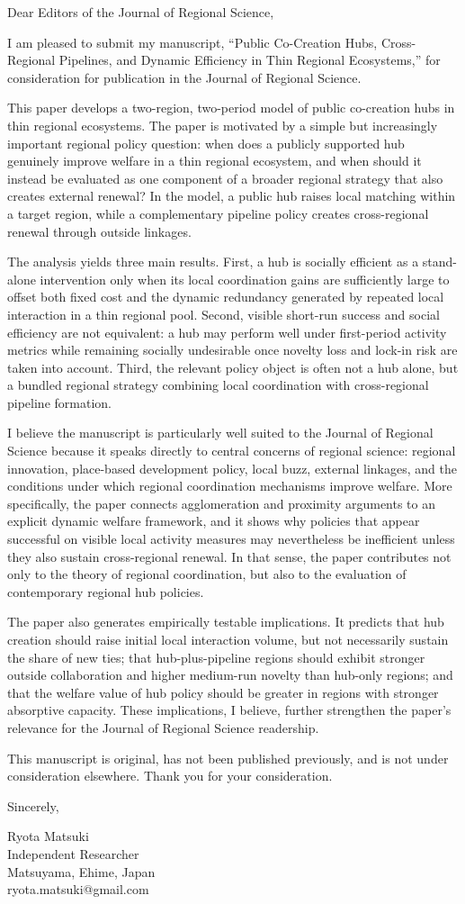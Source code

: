 \documentclass[11pt]{article}
\begin{document}
Dear Editors of the Journal of Regional Science,

I am pleased to submit my manuscript, ``Public Co-Creation Hubs, Cross-Regional Pipelines, and Dynamic Efficiency in Thin Regional Ecosystems,'' for consideration for publication in the Journal of Regional Science.

This paper develops a two-region, two-period model of public co-creation hubs in thin regional ecosystems. The paper is motivated by a simple but increasingly important regional policy question: when does a publicly supported hub genuinely improve welfare in a thin regional ecosystem, and when should it instead be evaluated as one component of a broader regional strategy that also creates external renewal? In the model, a public hub raises local matching within a target region, while a complementary pipeline policy creates cross-regional renewal through outside linkages.

The analysis yields three main results. First, a hub is socially efficient as a stand-alone intervention only when its local coordination gains are sufficiently large to offset both fixed cost and the dynamic redundancy generated by repeated local interaction in a thin regional pool. Second, visible short-run success and social efficiency are not equivalent: a hub may perform well under first-period activity metrics while remaining socially undesirable once novelty loss and lock-in risk are taken into account. Third, the relevant policy object is often not a hub alone, but a bundled regional strategy combining local coordination with cross-regional pipeline formation.

I believe the manuscript is particularly well suited to the Journal of Regional Science because it speaks directly to central concerns of regional science: regional innovation, place-based development policy, local buzz, external linkages, and the conditions under which regional coordination mechanisms improve welfare. More specifically, the paper connects agglomeration and proximity arguments to an explicit dynamic welfare framework, and it shows why policies that appear successful on visible local activity measures may nevertheless be inefficient unless they also sustain cross-regional renewal. In that sense, the paper contributes not only to the theory of regional coordination, but also to the evaluation of contemporary regional hub policies.

The paper also generates empirically testable implications. It predicts that hub creation should raise initial local interaction volume, but not necessarily sustain the share of new ties; that hub-plus-pipeline regions should exhibit stronger outside collaboration and higher medium-run novelty than hub-only regions; and that the welfare value of hub policy should be greater in regions with stronger absorptive capacity. These implications, I believe, further strengthen the paper's relevance for the Journal of Regional Science readership.

This manuscript is original, has not been published previously, and is not under consideration elsewhere. Thank you for your consideration.

\vfill

Sincerely,

Ryota Matsuki\\
Independent Researcher\\
Matsuyama, Ehime, Japan\\
ryota.matsuki@gmail.com
\end{document}
